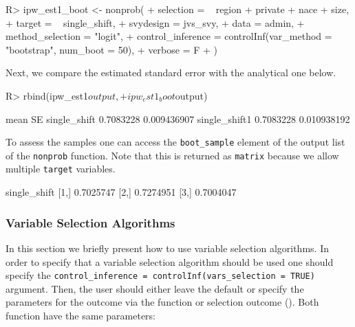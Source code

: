 \documentclass[
]{jss}
\begin{document}
\begin{CodeChunk}
\begin{CodeInput}
R> ipw_est1_boot <- nonprob(
+   selection = ~ region + private + nace + size,
+   target = ~ single_shift,
+   svydesign = jvs_svy,
+   data = admin,
+   method_selection = "logit",
+   control_inference = controlInf(var_method = "bootstrap", num_boot = 50),
+   verbose = F
+ )
\end{CodeInput}
\end{CodeChunk}

Next, we compare the estimated standard error with the analytical one
below.

\begin{CodeChunk}
\begin{CodeInput}
R> rbind(ipw_est1$output,
+       ipw_est1_boot$output)
\end{CodeInput}
\begin{CodeOutput}
                   mean          SE
single_shift  0.7083228 0.009436907
single_shift1 0.7083228 0.010938192
\end{CodeOutput}
\end{CodeChunk}

To assess the samples one can access the \texttt{boot\_sample} element
of the output list of the \texttt{nonprob} function. Note that this is
returned as \texttt{matrix} because we allow multiple \texttt{target}
variables.

\begin{CodeChunk}
\begin{CodeOutput}
     single_shift
[1,]    0.7025747
[2,]    0.7274951
[3,]    0.7004047
\end{CodeOutput}
\end{CodeChunk}

\subsubsection{Variable Selection
Algorithms}\label{variable-selection-algorithms}

In this section we briefly present how to use variable selection
algorithms. In order to specify that a variable selection algorithm
should be used one should specify the
\texttt{control\_inference\ =\ controlInf(vars\_selection\ =\ TRUE)}
argument. Then, the user should either leave the default or specify the
parameters for the outcome via the  function or
selection outcome (). Both function have the same
parameters:
\end{document}
